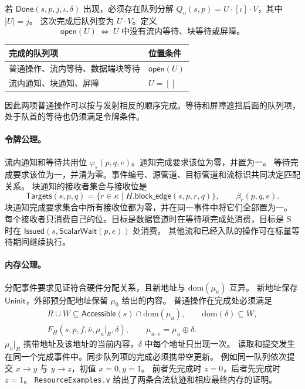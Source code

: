\documentclass[UTF8,a4paper,11pt,fontset=fandol]{ctexart}
\newcommand{\kw}[1]{\mathsf{#1}}
\begin{document}
若 \(\kw{Done}(s,p,j,\iota,\delta)\) 出现，必须存在队列分解
\(Q_u(s,p)=U\cdot[\iota]\cdot V\)，其中 \(|U|=j\)。
这次完成后队列变为 \(U\cdot V\)。定义
\[
 \kw{open}(U)\ \iff\ U\text{ 中没有流内等待、块等待或屏障。}
\]
\begin{center}
\begin{tabularx}{.96\linewidth}{@{}lX@{}}
\toprule
完成的队列项 & 位置条件 \\
\midrule
普通操作、流内等待、数据端块等待 & \(\kw{open}(U)\) \\
流内通知、块通知、屏障 & \(U=[]\) \\
\bottomrule
\end{tabularx}
\end{center}
因此两项普通操作可以按与发射相反的顺序完成。等待和屏障遮挡后面的队列项，
处于队首的等待也仍须满足令牌条件。

\paragraph{令牌公理。}
流内通知和等待共用位 \(\varphi_s(p,q,e)\)。通知完成要求该位为零，并置为一。
等待完成要求该位为一，并清为零。事件编号、源管道、目标管道和流标识共同决定匹配关系。
块通知的接收者集合与接收位是
\[
 \mathsf{Targets}(s,p,q)=\{r\in\kappa\mid H.\mathsf{block\_edge}(s,p,r,q)\},
 \qquad \beta_r(p,q,e).
\]
块通知完成要求集合中所有接收位都为零，并在同一事件中将它们全部置为一。
每个接收者只消费自己的位。目标是数据管道时在等待项完成处消费，目标是
\(\mathrm S\) 时在 \(\kw{Issued}(s,\kw{ScalarWait}(p,e))\) 处消费。
其他流和已经入队的操作可在标量等待期间继续执行。

\paragraph{内存公理。}
分配事件要求见证符合硬件分配关系，且新地址与 \(\mathrm{dom}(\mu_u)\) 互异。
新地址保存 \(\kw{Uninit}\)，外部预分配地址保留 \(\mu_0\) 给出的内容。
普通操作在完成处必须满足
\[
\begin{gathered}
 R\cup W\subseteq\mathsf{Accessible}(s)\cap\mathrm{dom}(\mu_u),\qquad
 \mathrm{dom}(\delta)\subseteq W,\\
 F_H(s,p,f,\bar\nu,\mu_u|_R,\delta),\qquad
 \mu_{u\cdot e}=\mu_u\oplus\delta .
\end{gathered}
\]
\(\mu_u|_R\) 携带地址及该地址的当前内容，\(\delta\) 中每个地址只出现一次。
读取和提交发生在同一个完成事件中。同步队列项的完成必须携带空更新。
例如同一队列依次提交 \(x\to y\) 与 \(y\to z\)，初值 \(x=0,y=1\)。
前者先完成时 \(z=0\)，后者先完成时 \(z=1\)。
\texttt{ResourceExamples.v} 给出了两条合法轨迹和相应最终内存的证明。
\end{document}
